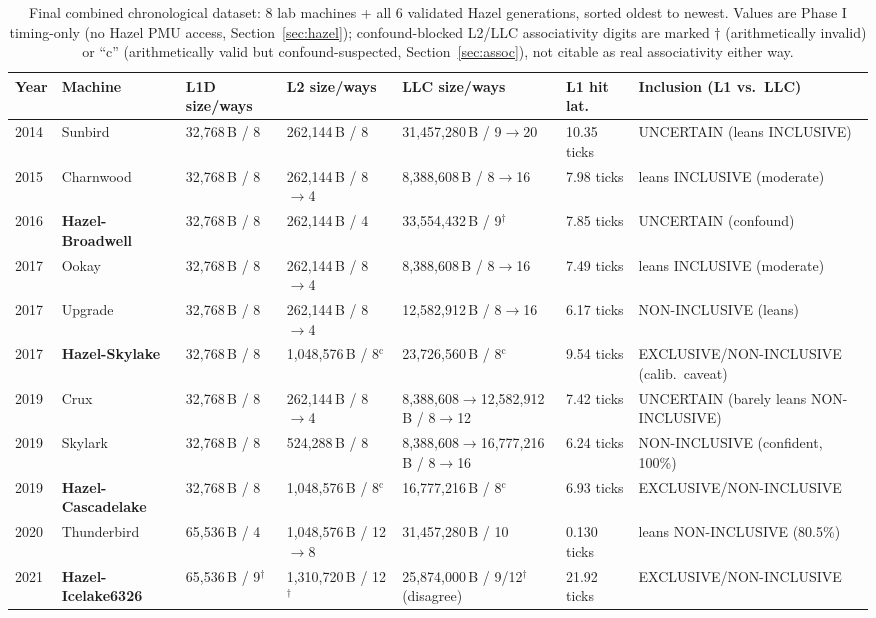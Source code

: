 \documentclass{article}
\begin{document}
\begin{table}[H]
\centering
{\scriptsize\setlength{\tabcolsep}{3pt}
\caption{Final combined chronological dataset: 8 lab machines + all 6 validated Hazel
generations, sorted oldest to newest. Values are Phase I timing-only (no Hazel PMU access,
Section~\ref{sec:hazel}); confound-blocked L2/LLC associativity digits are marked
$\dagger$ (arithmetically invalid) or ``c'' (arithmetically valid but confound-suspected,
Section~\ref{sec:assoc}), not citable as real associativity either way.}
\label{tab:final-combined}
\begin{tabularx}{\textwidth}{|l|l|X|X|X|l|X|}
\hline
Year & Machine & L1D size/ways & L2 size/ways & LLC size/ways & L1 hit lat.\ & Inclusion (L1 vs.\ LLC)\\
\hline
2014 & Sunbird & 32,768\,B / 8 & 262,144\,B / 8 & 31,457,280\,B / 9$\to$20 & 10.35 ticks & UNCERTAIN (leans INCLUSIVE)\\
2015 & Charnwood & 32,768\,B / 8 & 262,144\,B / 8$\to$4 & 8,388,608\,B / 8$\to$16 & 7.98 ticks & leans INCLUSIVE (moderate)\\
2016 & \textbf{Hazel-Broadwell} & 32,768\,B / 8 & 262,144\,B / 4 & 33,554,432\,B / 9$^\dagger$ & 7.85 ticks & UNCERTAIN (confound)\\
2017 & Ookay & 32,768\,B / 8 & 262,144\,B / 8$\to$4 & 8,388,608\,B / 8$\to$16 & 7.49 ticks & leans INCLUSIVE (moderate)\\
2017 & Upgrade & 32,768\,B / 8 & 262,144\,B / 8$\to$4 & 12,582,912\,B / 8$\to$16 & 6.17 ticks & NON-INCLUSIVE (leans)\\
2017 & \textbf{Hazel-Skylake} & 32,768\,B / 8 & 1,048,576\,B / 8$^{\text{c}}$ & 23,726,560\,B / 8$^{\text{c}}$ & 9.54 ticks & EXCLUSIVE/NON-INCLUSIVE (calib.\ caveat)\\
2019 & Crux & 32,768\,B / 8 & 262,144\,B / 8$\to$4 & 8,388,608$\to$12,582,912\,B / 8$\to$12 & 7.42 ticks & UNCERTAIN (barely leans NON-INCLUSIVE)\\
2019 & Skylark & 32,768\,B / 8 & 524,288\,B / 8 & 8,388,608$\to$16,777,216\,B / 8$\to$16 & 6.24 ticks & NON-INCLUSIVE (confident, 100\%)\\
2019 & \textbf{Hazel-Cascadelake} & 32,768\,B / 8 & 1,048,576\,B / 8$^{\text{c}}$ & 16,777,216\,B / 8$^{\text{c}}$ & 6.93 ticks & EXCLUSIVE/NON-INCLUSIVE\\
2020 & Thunderbird & 65,536\,B / 4 & 1,048,576\,B / 12$\to$8 & 31,457,280\,B / 10 & 0.130 ticks & leans NON-INCLUSIVE (80.5\%)\\
2021 & \textbf{Hazel-Icelake6326} & 65,536\,B / 9$^\dagger$ & 1,310,720\,B / 12$^\dagger$ & 25,874,000\,B / 9\slash 12$^\dagger$ (disagree) & 21.92 ticks & EXCLUSIVE/NON-INCLUSIVE\\

\end{tabularx}}
\end{table}
\end{document}
